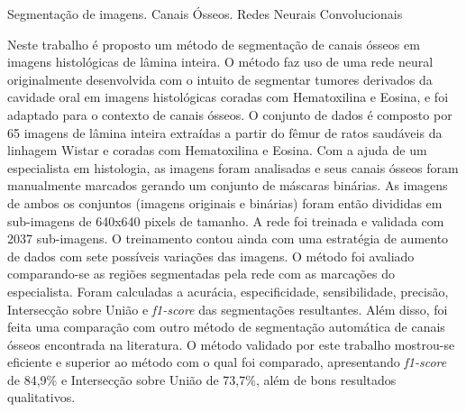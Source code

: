 \documentclass[dissertmst]{ppgco}
\begin{document}


\begin{resumo}{Segmentação de imagens. Canais Ósseos. Redes Neurais Convolucionais}

Neste trabalho é proposto um método de segmentação de canais ósseos em imagens histológicas de lâmina inteira. O método faz uso de uma rede neural originalmente desenvolvida com o intuito de segmentar tumores derivados da cavidade oral em imagens histológicas coradas com Hematoxilina e Eosina, e foi adaptado para o contexto de canais ósseos. O conjunto de dados é composto por 65 imagens de lâmina inteira extraídas a partir do fêmur de ratos saudáveis da linhagem Wistar e coradas com Hematoxilina e Eosina.
Com a ajuda de um especialista em histologia, as imagens foram analisadas e seus canais ósseos foram manualmente marcados gerando um conjunto de máscaras binárias. As imagens de ambos os conjuntos (imagens originais e binárias) foram então divididas em sub-imagens de 640x640 pixels de tamanho. A rede foi treinada e validada com 2037 sub-imagens. O treinamento contou ainda com uma estratégia de aumento de dados com sete possíveis variações das imagens. O método foi avaliado comparando-se as regiões segmentadas pela rede com as marcações do especialista. Foram calculadas a acurácia, especificidade, sensibilidade, precisão, Intersecção sobre União e \textit{f1-score} das segmentações resultantes. Além disso, foi feita uma comparação com outro método de segmentação automática de canais ósseos encontrada na literatura. O método validado por este trabalho mostrou-se eficiente e superior ao método com o qual foi comparado, apresentando \textit{f1-score} de 84,9\% e Intersecção sobre União de 73,7\%, além de bons resultados qualitativos.

\end{resumo}
\end{document}
